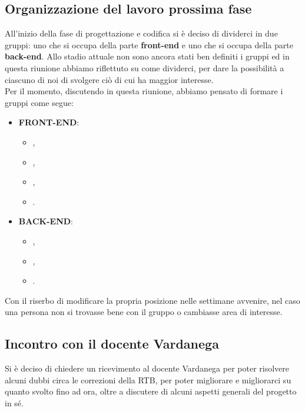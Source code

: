 \subsection{Organizzazione del lavoro prossima fase} 
All'inizio della fase di progettazione e codifica si è deciso di dividerci in due gruppi: uno che si occupa della parte \textbf{front-end} e uno che si occupa della parte \textbf{back-end}. Allo stadio attuale non sono ancora stati ben definiti i gruppi ed in questa riunione abbiamo riflettuto su come dividerci, per dare la possibilità a ciascuno di noi di svolgere ciò di cui ha maggior interesse. \\
Per il momento, discutendo in questa riunione, abbiamo pensato di formare i gruppi come segue:
\begin{itemize}
	\item \textbf{FRONT-END}:
		\begin{itemize}
			\item {\EP{},}
			\item {\GC{},}
			\item {\LW{},}
			\item {\PV{}.}
		\end{itemize}
	\item \textbf{BACK-END}:
		\begin{itemize}
			\item {\FP{},}
			\item {\MB{},}
			\item {\MG{}.}
		\end{itemize}
\end{itemize}
Con il riserbo di modificare la propria posizione nelle settimane avvenire, nel caso una persona non si trovasse bene con il gruppo o cambiasse area di interesse.  
 
\subsection{Incontro con il docente Vardanega}
Si è deciso di chiedere un ricevimento al docente Vardanega per poter risolvere alcuni dubbi circa le correzioni della RTB, per poter migliorare e migliorarci su quanto svolto fino ad ora, oltre a discutere di alcuni aspetti generali del progetto in sé.